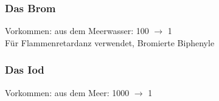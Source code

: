\documentclass{article}
\begin{document}
\subsubsection*{Das Brom}
Vorkommen: aus dem Meerwasser: 100 $\rightarrow$ 1 \\
Für Flammenretardanz verwendet, Bromierte Biphenyle
\subsubsection*{Das Iod}
Vorkommen: aus dem Meer: 1000 $\rightarrow$ 1 \\
\end{document}
